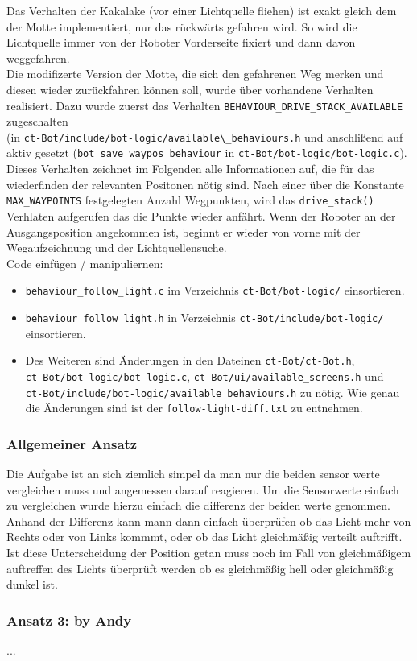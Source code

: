 Das Verhalten der Kakalake (vor einer Lichtquelle fliehen) ist exakt gleich dem der 
Motte implementiert, nur das rückwärts gefahren wird. So wird die Lichtquelle immer
von der Roboter Vorderseite fixiert und dann davon weggefahren. \\

Die modifizerte Version der Motte, die sich den gefahrenen Weg merken und diesen 
wieder zurückfahren können soll, wurde über vorhandene Verhalten realisiert.
Dazu wurde zuerst das Verhalten \verb+BEHAVIOUR_DRIVE_STACK_AVAILABLE+ zugeschalten \\
(in \verb+ct-Bot/include/bot-logic/available\_behaviours.h+ und anschlißend
auf aktiv gesetzt (\verb+bot_save_waypos_behaviour+ in
\verb+ct-Bot/bot-logic/bot-logic.c+). Dieses Verhalten zeichnet im Folgenden
alle Informationen auf, die für das wiederfinden der relevanten Positonen nötig sind.
Nach einer über die Konstante \verb+MAX_WAYPOINTS+ festgelegten Anzahl Wegpunkten,
wird das \verb+drive_stack()+ Verhlaten aufgerufen das die Punkte wieder anfährt.
Wenn der Roboter an der Ausgangsposition angekommen ist, beginnt er wieder von vorne mit
der Wegaufzeichnung und der Lichtquellensuche. \\

Code einfügen / manipuliernen:
\begin{itemize}
    \item \verb+behaviour_follow_light.c+  im Verzeichnis 
        \verb+ct-Bot/bot-logic/+ einsortieren.
    \item \verb+behaviour_follow_light.h+ in Verzeichnis
        \verb+ct-Bot/include/bot-logic/+ einsortieren.
    \item Des Weiteren sind Änderungen in den Dateinen \verb+ct-Bot/ct-Bot.h+, \\
        \verb+ct-Bot/bot-logic/bot-logic.c+,
        \verb+ct-Bot/ui/available_screens.h+ und \\
        \verb+ct-Bot/include/bot-logic/available_behaviours.h+ zu nötig.
        Wie genau die Änderungen sind ist der \verb+follow-light-diff.txt+ zu entnehmen.
\end{itemize}

\subsubsection{Allgemeiner Ansatz}

Die Aufgabe ist an sich ziemlich simpel da man nur die beiden sensor werte vergleichen muss und angemessen darauf reagieren.
Um die Sensorwerte einfach zu vergleichen wurde hierzu einfach die differenz der beiden werte genommen.
Anhand der Differenz kann mann dann einfach überprüfen ob das Licht mehr von Rechts oder von Links kommmt, oder ob das Licht gleichmäßig verteilt auftrifft.
Ist diese Unterscheidung der Position getan muss noch im Fall von gleichmäßigem auftreffen des Lichts überprüft werden ob es gleichmäßig hell oder gleichmäßig dunkel ist.



\subsubsection{Ansatz 3: by Andy}
...
